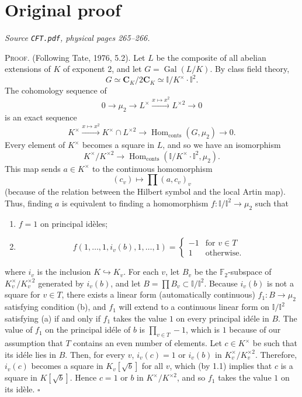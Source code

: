 \documentclass[11pt,a4paper]{article}
\begin{document}
\section*{Original proof}
\noindent\emph{Source \texttt{CFT.pdf}, physical pages 265--266.}\par\medskip
\noindent\textsc{Proof.} (Following Tate, 1976, 5.2). Let $L$ be the
composite of all abelian extensions of $K$ of exponent 2, and let
$G=\operatorname{Gal}(L/K)$. By class field theory,
\[
G\simeq \boldsymbol{C}_K/2\boldsymbol{C}_K
 \simeq \mathbb{I}/K^\times\cdot\mathbb{I}^2.
\]
The cohomology sequence of
\[
0\longrightarrow\mu_2\longrightarrow L^\times
 \xrightarrow{x\mapsto x^2}L^{\times2}\longrightarrow0
\]
is an exact sequence
\[
K^\times\xrightarrow{x\mapsto x^2}K^\times\cap L^{\times2}
 \longrightarrow\operatorname{Hom}_{\mathrm{conts}}(G,\mu_2)
 \longrightarrow0.
\]
Every element of $K^\times$ becomes a square in $L$, and so we have an
isomorphism
\[
K^\times/K^{\times2}\longrightarrow
\operatorname{Hom}_{\mathrm{conts}}(\mathbb{I}/K^\times\cdot\mathbb{I}^2,\mu_2).
\]
This map sends $a\in K^\times$ to the continuous homomorphism
\[
(c_v)\longmapsto\prod(a,c_v)_v
\]
(because of the relation between the Hilbert symbol and the local Artin map).
Thus, finding $a$ is equivalent to finding a homomorphism
$f:\mathbb{I}/\mathbb{I}^2\longrightarrow\mu_2$ such that
\begin{enumerate}
\renewcommand{\labelenumi}{(\alph{enumi})}
\item $f=1$ on principal id\`eles;
\item
\[
f(1,\ldots,1,i_v(b),1,\ldots,1)=
\begin{cases}
-1 & \text{for }v\in T\\
 1 & \text{otherwise.}
\end{cases}
\]
\end{enumerate}
where $i_v$ is the inclusion $K\hookrightarrow K_v$. For each $v$,
let $B_v$ be the $\mathbb{F}_2$-subspace of $K_v^\times/K_v^{\times2}$
generated by $i_v(b)$, and let
$B=\prod B_v\subset\mathbb{I}/\mathbb{I}^2$.
Because $i_v(b)$ is not a square for $v\in T$, there exists a linear
form (automatically continuous) $f_1:B\longrightarrow\mu_2$ satisfying
condition (b), and $f_1$ will extend to a continuous linear form on
$\mathbb{I}/\mathbb{I}^2$ satisfying (a) if and only if $f_1$ takes the
value $1$ on every principal id\'ele in $B$. The value of $f_1$ on the
principal id\'ele of $b$ is $\prod_{v\in T}-1$, which is $1$ because of
our assumption that $T$ contains an even number of elements. Let
$c\in K^\times$ be such that its id\'ele lies in $B$. Then, for every $v$,
$i_v(c)=1$ or $i_v(b)$ in $K_v^\times/K_v^{\times2}$. Therefore,
$i_v(c)$ becomes a square in $K_v[\sqrt{b}]$ for all $v$, which (by 1.1)
implies that $c$ is a square in $K[\sqrt{b}]$. Hence $c=1$ or $b$ in
$K^\times/K^{\times2}$, and so $f_1$ takes the value $1$ on its id\`ele.
\hfill$\square$
\end{document}
